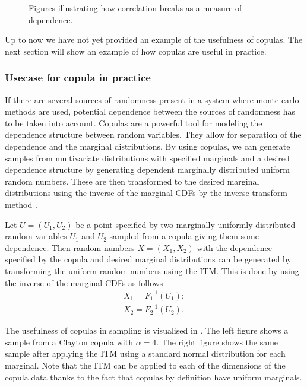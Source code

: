 \begin{figure}
\begin{minipage}{0.45\textwidth}
        \label{fig:exponentialDependenceScatterRet}
    \end{minipage}
    \caption{Figures illustrating how correlation breaks as a measure of dependence.}
    \label{fig:ExamplePlots}
\end{figure}

Up to now we have not yet provided an example of the usefulness of copulas. The next section will show an example of how copulas are useful in practice.

\subsubsection{Usecase for copula in practice}\label{sec:CopulaUseCase}
If there are several sources of randomness present in a system where monte carlo methods are used, potential dependence between the sources of randomness has to be taken into account. Copulas are a powerful tool for modeling the dependence structure between random variables. They allow for separation of the dependence and the marginal distributions. By using copulas, we can generate samples from multivariate distributions with specified marginals and a desired dependence structure by generating dependent marginally distributed uniform random numbers. These are then transformed to the desired marginal distributions using the inverse of the marginal \gls{CDF}s by the inverse transform method .

Let $U = (U_1,U_2)$ be a point specified by two marginally uniformly distributed random variables $U_1$ and $U_2$ sampled from a copula giving them some dependence. Then random numbers $X = (X_1,X_2)$ with the dependence specified by the copula and desired marginal distributions can be generated by transforming the uniform random numbers using the \gls{ITM}. This is done by using the inverse of the marginal \gls{CDF}s as follows
\begin{align*}
    X_1 = F_1^{-1}(U_1); \\
    X_2 = F_2^{-1}(U_2).
\end{align*}

The usefulness of copulas in sampling is visualised in . The left figure shows a sample from a Clayton copula with $\alpha = 4$. The right figure shows the same sample after applying the \gls{ITM} using a standard normal distribution for each marginal. Note that the \gls{ITM} can be applied to each of the dimensions of the copula data thanks to the fact that copulas by definition have uniform marginals. 

